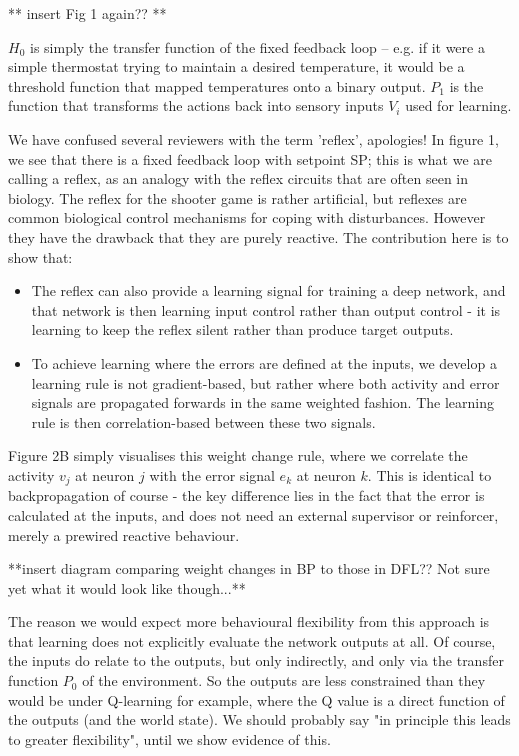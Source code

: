 \documentclass{article}
\begin{document}
	


		** insert Fig 1 again?? **
	
	$H_{0}$ is simply the transfer function of the fixed feedback loop – e.g. if it were a simple thermostat trying to maintain a desired temperature, it would be a threshold function that mapped temperatures onto a binary output. $P_{1}$ is the function that transforms the actions back into sensory inputs $V_{i}$ used for learning. 
	

		
	We have confused several reviewers with the term 'reflex', apologies! In figure 1, we see that there is a fixed feedback loop with setpoint SP; this is what we are calling a reflex, as an analogy with the reflex circuits that are often seen in biology. The reflex for the shooter game is rather artificial, but reflexes are common biological control mechanisms for coping with disturbances. However they have the drawback that they are purely reactive. The contribution here is to show that:
	\begin{itemize}
		\item The reflex can also provide a learning signal for training a deep network, and that network is then learning input control rather than output control - it is learning to keep the reflex silent rather than produce target outputs.
		\item To achieve learning where the errors are defined at the inputs, we develop a learning rule is not gradient-based, but rather where both activity and error signals are propagated forwards in the same weighted fashion. The learning rule is then correlation-based between these two signals.
	\end{itemize}
	
	
		Figure 2B simply visualises this weight change rule, where we correlate the activity $v_{j}$ at neuron $j$ with the error signal $e_{k}$ at neuron $k$. This is identical to backpropagation of course - the key difference lies in the fact that the error is calculated at the inputs, and does not need an external  supervisor or reinforcer, merely a prewired reactive behaviour.  
		
		
		**insert diagram comparing weight changes in BP to those in DFL?? Not sure yet what it would look like though...**
		
		
	The reason we would expect more behavioural flexibility from this approach is that learning does not explicitly evaluate the network outputs at all. Of course, the inputs do relate to the outputs, but only indirectly, and only via the transfer function $P_{0}$ of the environment. So the outputs are less constrained than they would be under Q-learning for example, where the Q value is a direct function of the outputs (and the world state). We should probably say "in principle this leads to greater flexibility", until we show evidence of this. 
	
\end{document}
